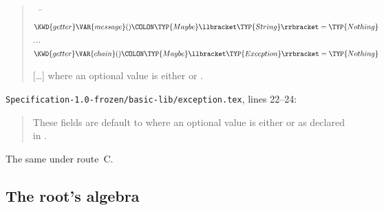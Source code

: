 \begin{description}
\begin{quote}
\begin{Fortress}
{\tt~~}\pushtabs\=\+\(  \KWD{getter} \VAR{message}()\COLON \TYP{Maybe}\llbracket\TYP{String}\rrbracket = \TYP{Nothing}\)\\
\(  \ldots\)\\
\(  \KWD{getter} \VAR{chain}()\COLON \TYP{Maybe}\llbracket\TYP{Exception}\rrbracket = \TYP{Nothing}\)\-\\\poptabs
\end{Fortress}
[\ldots]
where an optional value  is either  or
.
\end{quote}
\nolinkurl{Specification-1.0-frozen/basic-lib/exception.tex}, lines 22--24:
\begin{quote}
These fields are default to 
where an optional value  is either  or
 as declared in .
\end{quote}
\item[Route C] The same under route~C.
\end{description}

\subsection{The root's algebra}

